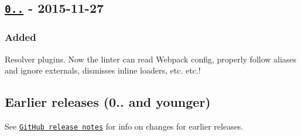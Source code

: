 \subsection*{\href{https://github.com/benmosher/eslint-plugin-import/compare/v0.10.1...v0.11.0}{\tt 0..} -\/ 2015-\/11-\/27}

\subsubsection*{Added}


\begin{DoxyItemize}
\item Resolver plugins. Now the linter can read Webpack config, properly follow aliases and ignore externals, dismisses inline loaders, etc. etc.!
\end{DoxyItemize}

\subsection*{Earlier releases (0.. and younger)}

See \href{https://github.com/benmosher/eslint-plugin-import/releases?after=v0.11.0}{\tt Git\+Hub release notes} for info on changes for earlier releases. 